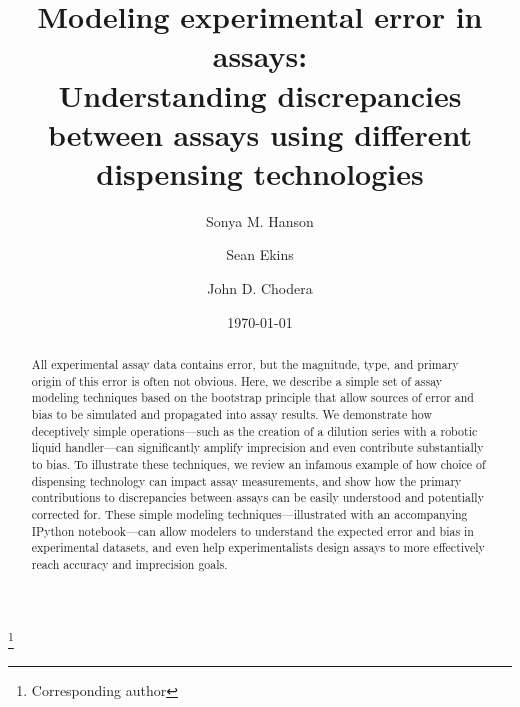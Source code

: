 \documentclass[aps,pre,twocolumn,nofootinbib,superscriptaddress,linenumbers]{revtex4-1}
\begin{document}
\title{Modeling experimental error in assays:\\
Understanding discrepancies between assays using different dispensing technologies}

\author{Sonya M. Hanson}
\author{Sean Ekins}
\author{John D. Chodera}
 \thanks{Corresponding author}

\date{\today}

\begin{abstract}

All experimental assay data contains error, but the magnitude, type, and primary origin of this error is often not obvious.
Here, we describe a simple set of assay modeling techniques based on the bootstrap principle that allow sources of error and bias to be simulated and propagated into assay results.
We demonstrate how deceptively simple operations---such as the creation of a dilution series with a robotic liquid handler---can significantly amplify imprecision and even contribute substantially to bias.
To illustrate these techniques, we review an infamous example of how choice of dispensing technology can impact assay measurements, and show how the primary contributions to discrepancies between assays can be easily understood and potentially corrected for.
These simple modeling techniques---illustrated with an accompanying IPython notebook---can allow modelers to understand the expected error and bias in experimental datasets, and even help experimentalists design assays to more effectively reach accuracy and imprecision goals.

\end{abstract}

\maketitle
\end{document}
